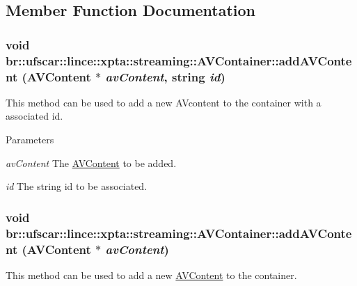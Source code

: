 \subsection{Member Function Documentation}
\hypertarget{classbr_1_1ufscar_1_1lince_1_1xpta_1_1streaming_1_1AVContainer_afb51ab7d4a485477e377f3d309a3033f}{
\subsubsection[{addAVContent}]{\setlength{\rightskip}{0pt plus 5cm}void br::ufscar::lince::xpta::streaming::AVContainer::addAVContent ({\bf AVContent} $\ast$ {\em avContent}, \/  string {\em id})}}
\label{classbr_1_1ufscar_1_1lince_1_1xpta_1_1streaming_1_1AVContainer_afb51ab7d4a485477e377f3d309a3033f}


This method can be used to add a new AVcontent to the container with a associated id. 


\begin{DoxyParams}{Parameters}
\item[{\em avContent}]The \hyperlink{classbr_1_1ufscar_1_1lince_1_1xpta_1_1streaming_1_1AVContent}{AVContent} to be added. \item[{\em id}]The string id to be associated. \end{DoxyParams}
\hypertarget{classbr_1_1ufscar_1_1lince_1_1xpta_1_1streaming_1_1AVContainer_a4ffc0e43e1048694cae3b30e292c3925}{
\subsubsection[{addAVContent}]{\setlength{\rightskip}{0pt plus 5cm}void br::ufscar::lince::xpta::streaming::AVContainer::addAVContent ({\bf AVContent} $\ast$ {\em avContent})}}
\label{classbr_1_1ufscar_1_1lince_1_1xpta_1_1streaming_1_1AVContainer_a4ffc0e43e1048694cae3b30e292c3925}


This method can be used to add a new \hyperlink{classbr_1_1ufscar_1_1lince_1_1xpta_1_1streaming_1_1AVContent}{AVContent} to the container. 


